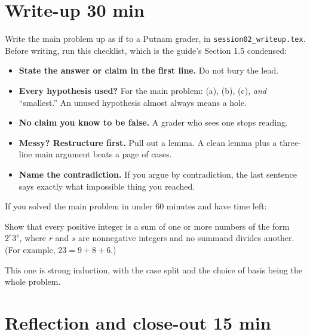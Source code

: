 \documentclass[11pt]{article}
\begin{document}
\section{Write-up \hfill 30 min}

Write the main problem up as if to a Putnam grader, in \texttt{session02\_writeup.tex}. Before writing, run this checklist, which is the guide's Section 1.5 condensed:
\begin{itemize}
  \item[\checkbox] \textbf{State the answer or claim in the first line.} Do not bury the lead.
  \item[\checkbox] \textbf{Every hypothesis used?} For the main problem: (a), (b), (c), \emph{and} ``smallest.'' An unused hypothesis almost always means a hole.
  \item[\checkbox] \textbf{No claim you know to be false.} A grader who sees one stops reading.
  \item[\checkbox] \textbf{Messy? Restructure first.} Pull out a lemma. A clean lemma plus a three-line main argument beats a page of cases.
  \item[\checkbox] \textbf{Name the contradiction.} If you argue by contradiction, the last sentence says exactly what impossible thing you reached.
\end{itemize}

If you solved the main problem in under 60 minutes and have time left:

\begin{problem}[Putnam 2005, A1]
Show that every positive integer is a sum of one or more numbers of the form $2^r 3^s$, where $r$ and $s$ are nonnegative integers and no summand divides another. (For example, $23 = 9 + 8 + 6$.)
\end{problem}
This one is strong induction, with the case split and the choice of basis being the whole problem.

\section{Reflection and close-out \hfill 15 min}
\end{document}
